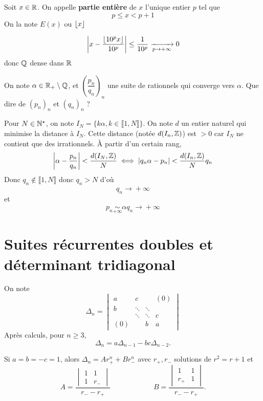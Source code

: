 \begin{dfn}
    Soit $x\in\mathbb R$. On appelle \textbf{partie entière} de $x$ l'unique entier $p$ tel que \[
        p\leq x<p+1
    \]
    On la note $E(x)$ ou $\left\lfloor x\right\rfloor$
\end{dfn}

\begin{csq}
    \[
        \left| x-\frac{\left\lfloor10^px\right\rfloor}{10^p} \right|\leq \frac1{10^p}\xrightarrow[p\to+\infty]{}0
    \]
    donc $\mathbb Q$ dense dans $\mathbb R$
\end{csq}

\begin{ex}
    On note $\alpha\in\mathbb R_+\setminus\mathbb Q$, et $ \left( \dfrac{p_n}{q_n} \right)_n$ une suite de rationnels qui converge vers $\alpha$. Que dire de $(p_n)_n$ et $ (q_n)_n$ ?

    Pour $N\in\mathbb N^\star$, on note $I_N=\{k\alpha, k\in\llbracket1 ,N\rrbracket\}$. On note $d$ un entier naturel qui minimise la distance à $I_N$. Cette distance (notée $d(I_n, \mathbb Z)$) est $>0$ car $I_N$ ne contient que des irrationnels. À partir d'un certain rang, \[
        \left| \alpha-\frac{p_n}{q_n} \right|<\frac{d(I_N, \mathbb Z)}N \iff |q_n\alpha-p_n|<\frac{d(I_n, \mathbb Z)}N q_n
    \]
    Donc $q_n\not\in\llbracket1,N\rrbracket$ donc $q_n>N$ d'où \[
        q_n\xrightarrow{}+\infty
    \]
    et \[
        p_n\underset{+\infty}\sim\alpha q_n\xrightarrow{}+\infty
    \]
\end{ex}

\section{Suites récurrentes doubles et déterminant tridiagonal}

On note \[
    \Delta_n= \begin{vmatrix}
        a   & c      &        & (0) \\
        b   & \ddots & \ddots & \\
            & \ddots & \ddots & c\\
        (0) &        & b      & a
    \end{vmatrix}
\]
Après calculs, pour $n\geq3$, \[
    \Delta_n=a\Delta_{n-1}-bc\Delta_{n-2}.
\]

\begin{ex}
    Si $a=b=-c=1$, alors $\Delta_n=Ar_+^n+Br_-^n$ avec $r_+, r_-$ solutions de $r^2=r+1$ et \[
        A=\frac{ \begin{vmatrix}
                1 & 1 \\ 1 & r_-
        \end{vmatrix} }{r_--r_+} \qquad \qquad \qquad B=\frac{ \begin{vmatrix}
                1 & 1 \\ r_+ & 1
        \end{vmatrix} }{r_--r_+}.
    \]
\end{ex}

